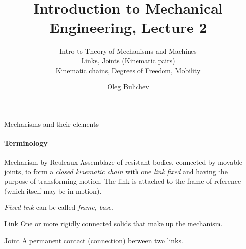 \documentclass[aspectratio=169]{beamer}
\title[IME]{Introduction to Mechanical Engineering, Lecture 2} %
\subtitle{Intro to Theory of Mechanisms and Machines
\\ Links, Joints (Kinematic pairs)     \\ Kinematic chains, Degrees of Freedom, Mobility  
         } %
\author{Oleg Bulichev}
\newcommand{\fbckg}[1]{\usebackgroundtemplate{\texttt{[image: \#1]}}}%
\begin{document}
\setlength{\abovedisplayskip}{0pt}
\setlength{\belowdisplayskip}{0pt}
\setlength{\abovedisplayshortskip}{0pt}
\setlength{\belowdisplayshortskip}{0pt}

\fbckg{fibeamer/figs/title_page.png}

\fbckg{fibeamer/figs/common.png}


\begin{frame}[t]{Mechanisms and their elements}
    \framesubtitle{Terminology}
\vspace{-0.4cm}
    \begin{exampleblock}{Mechanism by Reuleaux}
        Assemblage of resistant
        bodies, connected by movable joints, to form a \textit{closed kinematic chain} with one \textit{link fixed}
        and having the purpose of transforming motion. The link is attached to the frame of reference (which itself may be in motion).

        \textit{Fixed link} can be called \textit{frame, base}.
    \end{exampleblock}
    \begin{exampleblock}{Link}
        One or more rigidly connected solids that make up the mechanism.
    \end{exampleblock}
    \begin{exampleblock}{Joint}
        A permanent contact (connection) between two links.
    \end{exampleblock}
\end{frame}
\end{document}
